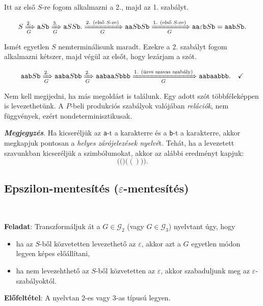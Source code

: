 \documentclass[a4paper,11pt]{article}
\newcommand{\emptyword}{\varepsilon}
\newcommand{\genword}[2]{\xRightarrow[{#1}]{#2}}
\begin{document}
	Itt az első $S$-re fogom alkalmazni a 2., majd az 1. szabályt.
	
	\[ S \genword{G}{\text{2.}} \texttt{a}S\texttt{b} \genword{G}{\text{3.}} \texttt{a}SS\texttt{b}. \genword{G}{\text{2. (első $S$-re)}} \texttt{aa}S\texttt{b}S\texttt{b} \genword{G}{\text{1. (első $S$-re)}} \texttt{aa}\emptyword\texttt{b}S\texttt{b} = \texttt{aa}\texttt{b}S\texttt{b}. \]
	
	Ismét egyetlen $S$ nemterminálisunk maradt. Ezekre a 2. szabályt fogom alkalmazni kétszer, majd végül az elsőt, hogy lezárjam a szót.
	
	\[ \texttt{aa}\texttt{b}S\texttt{b} \genword{G}{\text{2.}} \texttt{aaba}S\texttt{bb} \genword{G}{\text{2.}} \texttt{aabaa}S\texttt{bbb} \genword{G}{\text{1. (üres szavas szabály)}} \texttt{aabaa}\texttt{bbb}. ~~~ \checkmark \]
	
	Nem kell megijedni, ha más megoldást is találunk. Egy adott szót többféleképpen is levezethetünk. A $P$-beli produkciós szabályok valójában \textit{relációk}, nem függvények, ezért nondeterminisztikusak.

\textbf{\textit{Megjegyzés}}. Ha kicseréljük az \texttt{a}-t a \fbox{\texttt{(}} karakterre és a \texttt{b}-t a \fbox{\texttt{)}} karakterre, akkor megkapjuk pontosan a \textit{helyes zárójelezések nyelvé}t. Tehát, ha a levezetett szavunkban kicseréljük a szimbólumokat, akkor az alábbi eredményt kapjuk: \[ \Big( \big(\big) \big( () \big) \Big). \]

\newpage

\subsection{Epszilon-mentesítés ($\emptyword$-mentesítés)}

~\\[-2em]

\begin{mdframed}
	\textbf{Feladat}: Transzformáljuk át a $G \in \mathcal{G}_2$ (vagy $G \in \mathcal{G}_3$) nyelvtant úgy, hogy
	\begin{itemize}
		\item ha az $S$-ből közvetetten levezethető az $\emptyword$, akkor azt a $G$ egyetlen módon legyen képes előállítani,
		\item ha nem levezehthető az $S$-ből közvetetten az $\emptyword$, akkor szabaduljunk meg az $\emptyword$-szabályoktól.
	\end{itemize}
	
	\textbf{Előfeltétel}: A nyelvtan 2-es vagy 3-as típusú legyen.
\end{mdframed}
\end{document}
